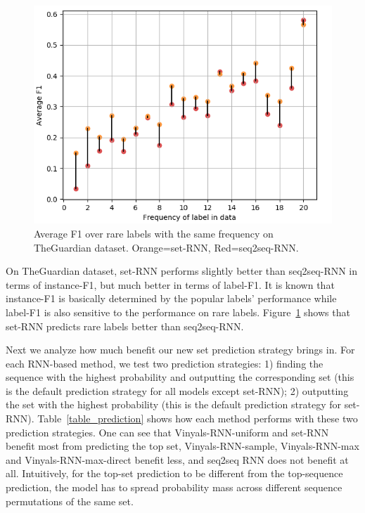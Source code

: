 \begin{figure}[t]
\includegraphics[width=1.0\columnwidth]{figs/labelf1.png}

\caption{Average F1 over rare labels with the same frequency on TheGuardian dataset. Orange=set-RNN, Red=seq2seq-RNN.}
\label{fig:labelf1}
\end{figure}

On TheGuardian dataset, set-RNN performs slightly better than seq2seq-RNN in terms of instance-F1, but much better in terms of label-F1. It is known that instance-F1 is basically determined by the popular labels' performance while label-F1 is also sensitive to the performance on rare labels. Figure~\ref{fig:labelf1} shows that set-RNN predicts rare labels better than seq2seq-RNN.

Next we analyze how much benefit our new set prediction strategy brings in. For each RNN-based method, we test two prediction strategies: 1) finding the sequence with the highest probability and outputting the corresponding set (this is the default prediction strategy for all models except set-RNN); 2) outputting the set with the  highest probability (this is the default prediction strategy for set-RNN). Table~\ref{table_prediction} shows how each method performs with these two prediction strategies. One can see that Vinyals-RNN-uniform and set-RNN benefit most from predicting the top set,  Vinyals-RNN-sample, Vinyals-RNN-max and Vinyals-RNN-max-direct benefit less, and seq2seq RNN does not benefit at all. Intuitively, for the top-set prediction to be different from the top-sequence prediction, the model has to spread probability mass across different sequence permutations of the same set. 


